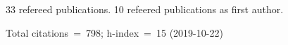 33 refereed publications. 10 refeered publications as first author.

Total citations~=~798; h-index~=~15 (2019-10-22)